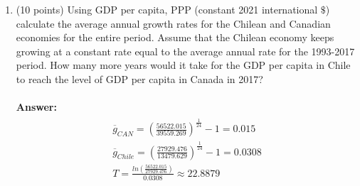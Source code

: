\documentclass[letterpaper,12pt]{article}
\theoremstyle{dotlessS}
\begin{document}
\begin{enumerate}[label=\alph*]
\item (10 points) Using  GDP per capita, PPP (constant 2021 international $\$$) calculate the average annual growth rates for the Chilean and Canadian economies for the entire period. Assume that the Chilean economy keeps growing at a constant rate equal to the average annual rate for the 1993-2017 period. How many more years would it take for the GDP per capita in Chile to reach the level of GDP per capita in Canada in 2017? \\
\\
\textbf{Answer:}
\begin{eqnarray*}
\begin{array}{c}
\overline{g}_{CAN}=\left(\frac{56522.015}{39559.269}\right)^{\frac{1}{24}}-1=0.015 \\[2ex]
\overline{g}_{Chile}=\left(\frac{27929.476}{13479.629}\right)^{\frac{1}{24}}-1=0.0308 \\[2ex]
T=\frac{ln\left(\frac{56522.015}{27929.476}\right)}{0.0308}\approx 22.8879
\end{array}
\end{eqnarray*}
\end{enumerate}  
\end{document}
